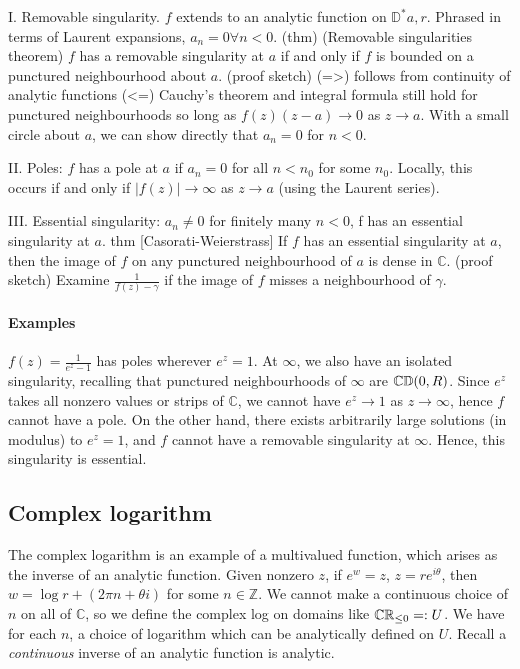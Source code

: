 \documentclass{article}
\begin{document}
I. Removable singularity. $f$ extends to an analytic function on $\mathbb{D}^*{a, r}$. Phrased in terms of Laurent expansions, $a_n = 0 \forall n < 0$.
(thm) (Removable singularities theorem) $f$ has a removable singularity at $a$ if and only if $f$ is bounded on a punctured neighbourhood about $a$.
(proof sketch) (=>) follows from continuity of analytic functions
(<=) Cauchy's theorem and integral formula still hold for punctured neighbourhoods so long as $f(z) (z-a) \to 0$ as $z \to a$.  With a small circle about $a$, we can show directly that $a_n = 0$ for $n < 0$.

II. Poles: $f$ has a pole at $a$ if $a_n = 0$ for all $n < n_0$ for some $n_0$. Locally, this occurs if and only if $|f(z)| \to \infty$ as $z \to a$ (using the Laurent series).

III. Essential singularity: $a_n \neq 0$ for finitely many $n < 0$, f has an essential singularity at $a$.
thm [Casorati-Weierstrass] If $f$ has an essential singularity at $a$, then the image of $f$ on any punctured neighbourhood of $a$ is dense in $\mathbb{C}$.
(proof sketch) Examine $\frac1{f(z) - \gamma}$ if the image of $f$ misses a neighbourhood of $\gamma$.

\paragraph{Examples}
$f(z) = \frac1{e^z - 1}$ has poles wherever $e^z = 1$.
At $\infty$, we also have an isolated singularity, recalling that punctured neighbourhoods of $\infty$ are $\mathbb{C}\\ \mathbb{D}(0, R)$. Since $e^z$ takes all nonzero values or strips of $\mathbb{C}$, we cannot have $e^z \to 1$ as $z \to \infty$, hence $f$ cannot have a pole.  On the other hand, there exists arbitrarily large solutions (in modulus) to $e^z = 1$, and $f$ cannot have a removable singularity at $\infty$.  Hence, this singularity is essential.

\subsection{Complex logarithm}
The complex logarithm is an example of a multivalued function, which arises as the inverse of an analytic function. Given nonzero $z$, if $e^w = z$, $z = r e^{i \theta}$, then $w = \log r + (2 \pi n + \theta i)$ for some $n \in \mathbb{Z}$.  We cannot make a continuous choice of $n$ on all of $\mathbb{C}$, so we define the complex log on domains like $\mathbb{C} \\ \mathbb{R}_{\leq 0} =: U$. We have for each $n$, a choice of logarithm which can be analytically defined on $U$.  Recall a \emph{continuous} inverse of an analytic function is analytic.
\end{document}

